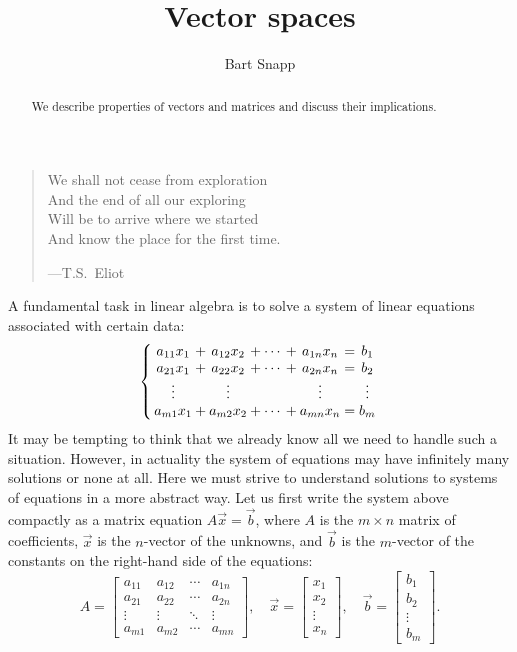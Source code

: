 \documentclass{ximera}
\author{Bart Snapp}
\title{Vector spaces}
\begin{document}
\begin{abstract}
  We describe properties of vectors and matrices and discuss their
  implications.
\end{abstract}
\maketitle

\begin{quote}
  We shall not cease from exploration\\
  And the end of all our exploring\\
  Will be to arrive where we started\\
  And know the place for the first time.

  \hfill ---T.S.\ Eliot
\end{quote}

A fundamental task in linear algebra is to solve a system of linear
equations associated with certain data:
\begin{equation*}
  \left\{ \,
  \begin{array}{*{9}{@{}c@{}}}
    a_{11} x_1      & {}+{} & a_{12} x_2 & {}+{} & \cdots & {}+{} & a_{1n} x_n & {}\mathrel{=}{} & b_1 \\
    a_{21} x_1      & {}+{} & a_{22} x_2 & {}+{} & \cdots & {}+{} & a_{2n} x_n & {}\mathrel{=}{} & b_2 \\
    \vdots          &       & \vdots     &       &        &       & \vdots &       & \vdots \\
    a_{m1} x_1      & {}+{} & a_{m2} x_2 & {}+{} & \cdots & {}+{} & a_{mn} x_n & {}\mathrel{=}{} & b_m
  \end{array}
  \, \right.
\end{equation*}
It may be tempting to think that we already know all we need to handle such a
situation. However, in actuality the system of equations may have infinitely many
solutions or none at all. Here we must strive to understand solutions to systems of equations in a more
abstract way. Let us first write the system above compactly as a matrix equation $A \vec{x} =
  \vec{b}$, where $A$ is the $m \times n$ matrix of coefficients, $\vec{x}$ is
the
$n$-vector of the unknowns, and $\vec{b}$ is the $m$-vector of the constants on
the right-hand side of the equations:
\[
  A =
  \begin{bmatrix}
    a_{11} & a_{12} & \cdots & a_{1n} \\
    a_{21} & a_{22} & \cdots & a_{2n} \\
    \vdots & \vdots & \ddots & \vdots \\
    a_{m1} & a_{m2} & \cdots & a_{mn}
  \end{bmatrix}, \quad
  \vec{x} =
  \begin{bmatrix}
    x_1 \\ x_2 \\ \vdots \\ x_n
  \end{bmatrix}, \quad
  \vec{b} =
  \begin{bmatrix}
    b_1 \\ b_2 \\ \vdots \\ b_m
  \end{bmatrix}.
\]
\end{document}
